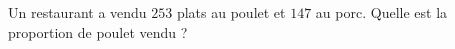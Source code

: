 
\begin{exercice}\label{exoPremiere-0011}

    Un restaurant a vendu \( 253\) plats au poulet et \( 147\) au porc. Quelle est la proportion de poulet vendu ?

\end{exercice}
